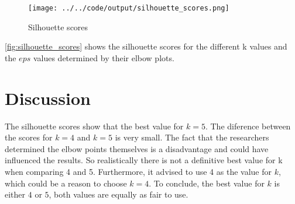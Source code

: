\documentclass[twoside, a4paper, fleqn, reqno]{article}
\begin{document}
\begin {figure}[H]
	\centering
	\texttt{[image: ../../code/output/silhouette\_scores.png]}
	\caption{Silhouette scores}
	\label{fig:silhouette_scores}
\end {figure}

\autoref{fig:silhouette_scores} shows the silhouette scores for the different k values
and the $eps$ values determined by their elbow plots.

\section{Discussion}

The silhouette scores show that the best value for $k=5$. The diference between the scores for
$k=4$ and $k=5$ is very small.
The fact that the researchers determined the elbow points themselves is a disadvantage
and could have influenced the results.
So realistically there is not a definitive best value for k when comparing 4 and 5.
Furthermore, it advised to use 4 as the value for $k$, which could be a reason to choose $k=4$.
To conclude, the best value for $k$ is either $4$ or $5$, both values are equally as fair to use. 
\end{document}
